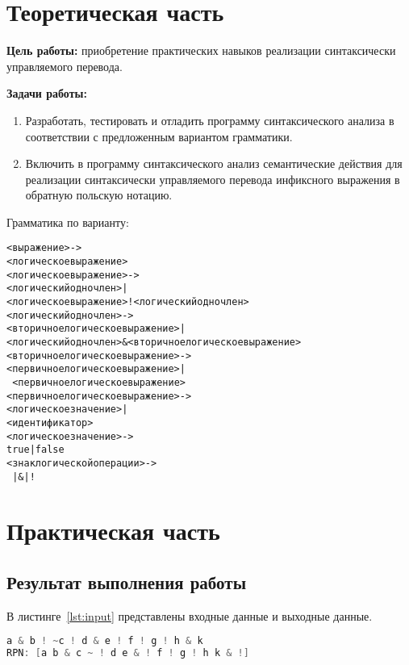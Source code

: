 \chapter{Теоретическая часть}

\textbf{Цель работы:} приобретение практических навыков реализации синтаксически управляемого перевода.

\textbf{Задачи работы:}

\begin{enumerate}
	\item Разработать, тестировать и отладить программу синтаксического анализа
	в соответствии с предложенным вариантом грамматики.
	\item Включить в программу синтаксического анализ семантические действия
	для реализации синтаксически управляемого перевода инфиксного
	выражения в обратную польскую нотацию.
\end{enumerate}

Грамматика по варианту:

\begin{framed}
	\ttfamily 
	\begin{alltt}
<выражение> ->
   <логическое выражение>
<логическое выражение> ->
    <логический одночлен> | 
    <логическое выражение> ! <логический одночлен>
<логический одночлен> ->
    <вторичное логическое выражение> | 
    <логический одночлен> \& <вторичное логическое выражение>
<вторичное логическое выражение> ->
    <первичное логическое выражение> |
    ~ <первичное логическое выражение>
<первичное логическое выражение> ->
    <логическое значение> |
<идентификатор>
    <логическое значение> ->
    true | false
<знак логической операции> ->
    ~ | & | !
\end{alltt}
\end{framed}

\chapter{Практическая часть}


\section{Результат выполнения работы}

В листинге~\ref{lst:input} представлены входные данные и выходные данные.

\begin{lstlisting}[language=Go, caption={Входная и выходные данные}, label=lst:input]
a & b ! ~c ! d & e ! f ! g ! h & k
RPN: [a b & c ~ ! d e & ! f ! g ! h k & !]
\end{lstlisting}
